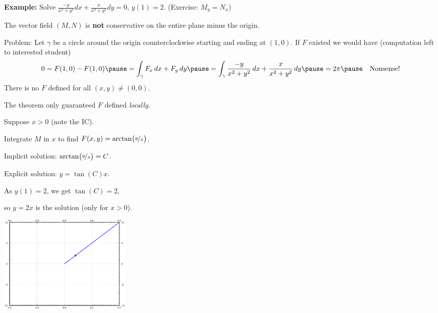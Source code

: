 \documentclass[10pt,aspectratio=169]{beamer}
\begin{document}
\begin{frame}

\textbf{Example:}
Solve
\quad
$\displaystyle
\frac{-y}{x^2+y^2} dx + \frac{x}{x^2+y^2} dy = 0$, \quad $y(1) = 2$.
\qquad
\pause
(Exercise: $M_y = N_x$)

\medskip
\pause

The vector field
$(M,N)$ is \textbf{not} conservative on the entire plane minus the origin.

\pause
Problem: Let $\gamma$ be a circle around the origin counterclockwise
starting and ending at $(1,0)$.
\pause
If $F$ existed we would have
(computation left to interested student)
\[
0 = F(1,0) - F(1,0) \pause = \int_\gamma F_x \, dx + F_y \, dy \pause = \int_\gamma \frac{-y}{x^2+y^2} \, dx +
\frac{x}{x^2+y^2} \, dy \pause = 2\pi 
\pause
\quad
\text{Nonsense!}
\]
\pause
There is no $F$ defined for all $(x,y) \not= (0,0)$.

\medskip
\pause

The theorem only guaranteed $F$ defined \emph{locally}.

\medskip
\pause

Suppose $x > 0$ (note the IC).

\pause
Integrate $M$ in $x$ to find
\quad $F(x,y) = \operatorname{arctan} \bigl( \nicefrac{y}{x} \bigr)$.

\pause
Implicit solution:
\quad
$\operatorname{arctan} \bigl( \nicefrac{y}{x} \bigr) = C$.

\pause
Explicit solution: \quad  $y = \tan(C) x$.

\pause
As $y(1)=2$, we get $\tan(C) = 2$,

so \quad $y=2x$ \quad is the solution (only for $x > 0$).

\vspace*{-1.65in}
\hfill
\includegraphics[width=2.5in]{../figures/exact-y2x}

\end{frame}
\end{document}
